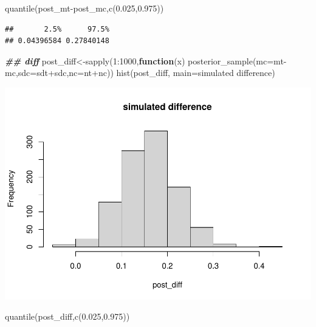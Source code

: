 \documentclass[
]{book}
\newenvironment{Shaded}{\begin{snugshade}}{\end{snugshade}}
\newcommand{\AttributeTok}[1]{\textcolor[rgb]{0.77,0.63,0.00}{#1}}
\newcommand{\ControlFlowTok}[1]{\textcolor[rgb]{0.13,0.29,0.53}{\textbf{#1}}}
\newcommand{\DecValTok}[1]{\textcolor[rgb]{0.00,0.00,0.81}{#1}}
\newcommand{\DocumentationTok}[1]{\textcolor[rgb]{0.56,0.35,0.01}{\textbf{\textit{#1}}}}
\newcommand{\FloatTok}[1]{\textcolor[rgb]{0.00,0.00,0.81}{#1}}
\newcommand{\FunctionTok}[1]{\textcolor[rgb]{0.00,0.00,0.00}{#1}}
\newcommand{\NormalTok}[1]{#1}
\newcommand{\OtherTok}[1]{\textcolor[rgb]{0.56,0.35,0.01}{#1}}
\newcommand{\SpecialCharTok}[1]{\textcolor[rgb]{0.00,0.00,0.00}{#1}}
\newcommand{\StringTok}[1]{\textcolor[rgb]{0.31,0.60,0.02}{#1}}
\theoremstyle{definition}
\theoremstyle{definition}
\theoremstyle{definition}
\theoremstyle{definition}
\theoremstyle{remark}
\begin{document}
\begin{Shaded}
\begin{Highlighting}[]
         \FunctionTok{quantile}\NormalTok{(post\_mt}\SpecialCharTok{{-}}\NormalTok{post\_mc,}\FunctionTok{c}\NormalTok{(}\FloatTok{0.025}\NormalTok{,}\FloatTok{0.975}\NormalTok{))}
\end{Highlighting}
\end{Shaded}

\begin{verbatim}
##       2.5%      97.5% 
## 0.04396584 0.27840148
\end{verbatim}

\begin{Shaded}
\begin{Highlighting}[]
  \DocumentationTok{\#\# diff}
\NormalTok{         post\_diff}\OtherTok{\textless{}{-}}\FunctionTok{sapply}\NormalTok{(}\DecValTok{1}\SpecialCharTok{:}\DecValTok{1000}\NormalTok{,}\ControlFlowTok{function}\NormalTok{(x) }\FunctionTok{posterior\_sample}\NormalTok{(}\AttributeTok{mc=}\NormalTok{mt}\SpecialCharTok{{-}}\NormalTok{mc,}\AttributeTok{sdc=}\NormalTok{sdt}\SpecialCharTok{+}\NormalTok{sdc,}\AttributeTok{nc=}\NormalTok{nt}\SpecialCharTok{+}\NormalTok{nc))}
    \FunctionTok{hist}\NormalTok{(post\_diff, }\AttributeTok{main=}\StringTok{\textquotesingle{}simulated difference\textquotesingle{}}\NormalTok{)}
\end{Highlighting}
\end{Shaded}

\includegraphics{_main_files/figure-latex/unnamed-chunk-32-2.pdf}

\begin{Shaded}
\begin{Highlighting}[]
             \FunctionTok{quantile}\NormalTok{(post\_diff,}\FunctionTok{c}\NormalTok{(}\FloatTok{0.025}\NormalTok{,}\FloatTok{0.975}\NormalTok{))}
\end{Highlighting}
\end{Shaded}
\end{document}
